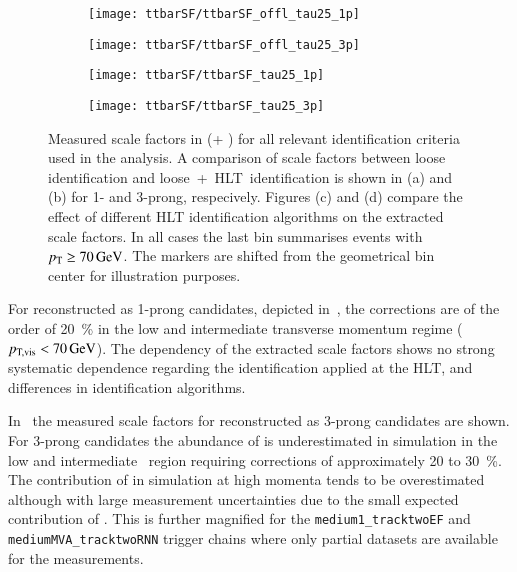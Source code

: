 \begin{figure}[htbp]
  \centering

  \begin{subfigure}[t]{.495\textwidth}
    \texttt{[image: ttbarSF/ttbarSF\_offl\_tau25\_1p]}
    \caption{}
    \label{fig:ttbarSF_postfit_SF_a}
  \end{subfigure}\hfill%
  \begin{subfigure}[t]{.495\textwidth}
    \texttt{[image: ttbarSF/ttbarSF\_offl\_tau25\_3p]}
    \caption{}
    \label{fig:ttbarSF_postfit_SF_b}
  \end{subfigure}

  \begin{subfigure}[t]{.495\textwidth}
    \texttt{[image: ttbarSF/ttbarSF\_tau25\_1p]}
    \caption{}
    \label{fig:ttbarSF_postfit_SF_c}
  \end{subfigure}\hfill%
  \begin{subfigure}[t]{.495\textwidth}
    \texttt{[image: ttbarSF/ttbarSF\_tau25\_3p]}
    \caption{}
    \label{fig:ttbarSF_postfit_SF_d}
  \end{subfigure}

  \caption{Measured \faketauhadvis scale factors in \ttbar
    (\POWHEGBOX[v2] + \PYTHIA[8]) for all relevant \tauhadvis
    identification criteria used in the analysis. A comparison of
    \faketauhadvis scale factors between loose identification and
    loose~+~HLT~identification is shown in (a) and (b) for 1- and
    3-prong, respecively. Figures (c) and (d) compare the effect of
    different HLT identification algorithms on the extracted scale
    factors. In all cases the last bin summarises events with
    \tauhadvis~$\pT \geq \SI{70}{\GeV}$.  The markers are shifted from
    the geometrical bin center for illustration purposes.}
  \label{fig:ttbarSF_postfit_SF}
\end{figure}

For \faketauhadvis reconstructed as 1-prong \tauhadvis candidates,
depicted in~,
the corrections are of the order of \SI{20}{\percent} in the low and
intermediate transverse momentum regime ($\pTvis < \SI{70}{\GeV}$).
The dependency of the extracted scale factors shows no strong
systematic dependence regarding the \tauhadvis identification applied
at the HLT, and differences in identification algorithms.

In~ the
measured scale factors for \faketauhadvis reconstructed as 3-prong
candidates are shown. For 3-prong candidates the abundance of
\faketauhadvis is underestimated in simulation in the low and
intermediate \tauhadvis~\pT region requiring corrections of
approximately \num{20} to \SI{30}{\percent}. The contribution of
\faketauhadvis in simulation at high momenta tends to be overestimated
although with large measurement uncertainties due to the small
expected contribution of \faketauhadvis. This is further magnified for
the \texttt{medium1\_tracktwoEF} and \texttt{mediumMVA\_tracktwoRNN}
trigger chains where only partial datasets are available for the
measurements.


